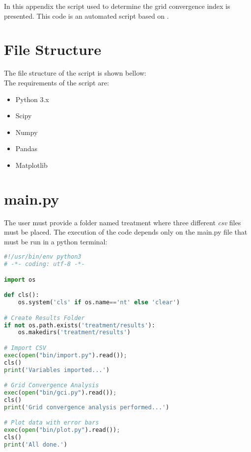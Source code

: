 \noindent
In this appendix the script used to determine the grid convergence index is presented. This code is an automated script based on \textcite{celik2008}.
\section{File Structure}
\noindent
The file structure of the script is shown bellow:
\\
\noindent
The requirements of the script are:
\begin{itemize}
\item Python 3.x
\item Scipy
\item Numpy
\item Pandas
\item Matplotlib
\end{itemize}
\section{main.py}
The user must provide a folder named treatment where three different \textit{csv} files must be placed. The execution of the code depends only on the main.py file that must be run in a python terminal:

\begin{lstlisting}[language=python]
#!/usr/bin/env python3
# -*- coding: utf-8 -*-

import os

def cls():
    os.system('cls' if os.name=='nt' else 'clear')

# Create Results Folder
if not os.path.exists('treatment/results'):
    os.makedirs('treatment/results')

# Import CSV
exec(open("bin/import.py").read());
cls()
print('Variables imported...')

# Grid Convergence Analysis
exec(open("bin/gci.py").read());
cls()
print('Grid convergence analysis performed...')

# Plot data with error bars
exec(open("bin/plot.py").read());
cls()
print('All done.')
\end{lstlisting}
